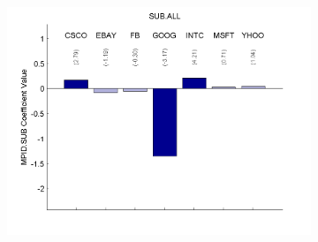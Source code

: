 \documentclass{article}
\begin{document}
\begin{figure}[htp!]
\begin{subfigure}{0.31\textwidth}
\includegraphics[width=\linewidth]{docs/Regression_Ratio_30sec_11_MPID_SUB_1MPIDLags_5DepVarLags.pdf}
\end{subfigure}



\end{figure}
\end{document}
